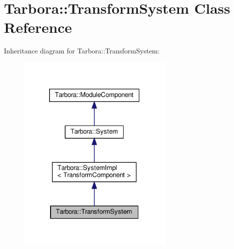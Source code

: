 \hypertarget{classTarbora_1_1TransformSystem}{}\section{Tarbora\+:\+:Transform\+System Class Reference}
\label{classTarbora_1_1TransformSystem}


Inheritance diagram for Tarbora\+:\+:Transform\+System\+:
\nopagebreak
\begin{figure}[H]
\begin{center}
\leavevmode
\includegraphics[width=217pt]{classTarbora_1_1TransformSystem__inherit__graph}
\end{center}
\end{figure}


